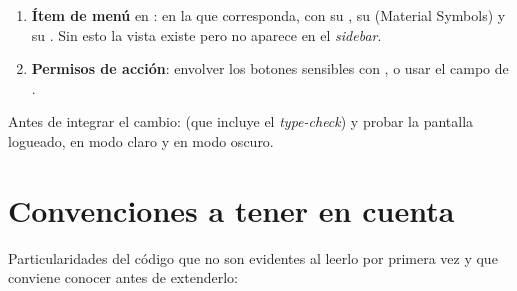 \begin{enumerate}
\item \textbf{Ítem de menú} en \allowbreak {}\allowbreak {}\allowbreak {}: en la  que corresponda, con su , su  (Material Symbols) y su . Sin esto la vista existe pero no aparece en el \emph{sidebar}.

\item \textbf{Permisos de acción}: envolver los botones sensibles con \allowbreak {}\allowbreak {}\allowbreak {}\allowbreak {}, o usar el campo  de .
\end{enumerate}

Antes de integrar el cambio:  (que incluye el \emph{type-check}) y probar la pantalla logueado, en modo claro y en modo oscuro.

\section{Convenciones a tener en cuenta}
\label{sec:mt-convenciones}

Particularidades del código que no son evidentes al leerlo por primera vez y que conviene conocer antes de extenderlo:


